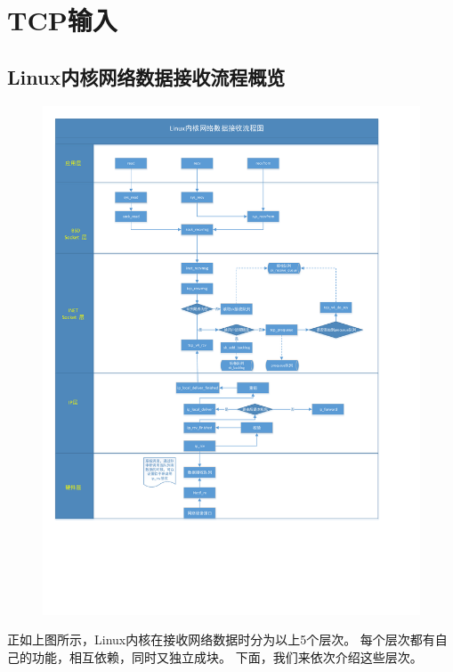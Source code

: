 \chapter{TCP输入}
\label{chapter:tcp_input}

    \minitoc

    \section{Linux内核网络数据接收流程概览}
        \begin{figure}[htb]        
            \centering
            \includegraphics[width=\textwidth]{images/Linux_Network_Receive.pdf}
        \end{figure}    
        正如上图所示，Linux内核在接收网络数据时分为以上5个层次。
        每个层次都有自己的功能，相互依赖，同时又独立成块。
        下面，我们来依次介绍这些层次。
